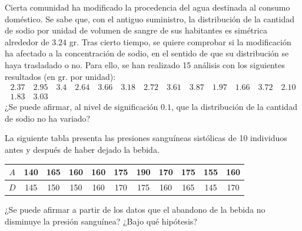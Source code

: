 \begin{ejercicio}
    Cierta comunidad ha modificado la procedencia del agua destinada al consumo doméstico. Se sabe que, con el antiguo suministro, la distribución de la cantidad de sodio por unidad de volumen de sangre de sus habitantes es simétrica alrededor de $3.24$ gr. Tras cierto tiempo, se quiere comprobar si la modificación ha afectado a la concentración de sodio, en el sentido de que su distribución se haya trasladado o no. Para ello, se han realizado 15 análisis con los siguientes resultados (en gr. por unidad):
    \begin{multline*}
        2.37 \quad 2.95 \quad 3.4 \quad 2.64 \quad 3.66 \quad 3.18 \quad 2.72 \quad 3.61 \quad 3.87 \quad 1.97 \quad 1.66 \quad 3.72 \quad 2.10 \\ 1.83 \quad 3.03
    \end{multline*}
    ¿Se puede afirmar, al nivel de significación $0.1$, que la distribución de la cantidad de sodio no ha variado?
\end{ejercicio}

\begin{ejercicio}
    La siguiente tabla presenta las presiones sanguíneas sistólicas de 10 individuos antes y después de haber dejado la bebida.
    \begin{table}[H]
    \centering
    \begin{tabular}{c|cccccccccc}
        \hline
        $A$ & 140 & 165 & 160 & 160 & 175 & 190 & 170 & 175 & 155 & 160 \\
        \hline
        $D$ & 145 & 150 & 150 & 160 & 170 & 175 & 160 & 165 & 145 & 170 \\
        \hline
    \end{tabular}
    \end{table}
    \noindent
    ¿Se puede afirmar a partir de los datos que el abandono de la bebida no disminuye la presión sanguínea? ¿Bajo qué hipótesis?
\end{ejercicio}

